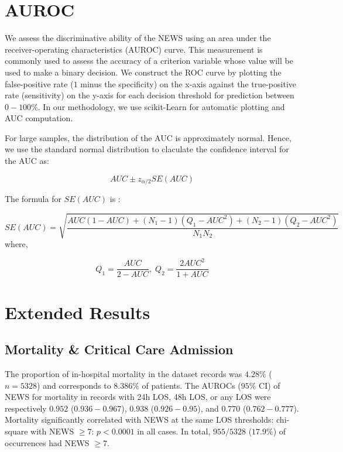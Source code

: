 \documentclass[10pt,journal, compsoc]{IEEEtran}
\begin{document}
\section{AUROC}
\label{appendix:auroc}
We assess the discriminative ability of the NEWS using an area under the receiver-operating characteristics (AUROC) curve. This measurement is commonly used to assess the accuracy of a criterion variable whose value will be used to make a binary decision. We construct the ROC curve by plotting the false-positive rate ($1$ minus the specificity) on the x-axis against the true-positive rate (sensitivity) on the y-axis for each decision threshold for prediction between $0-100\%$. In our methodology, we use scikit-Learn for automatic plotting and AUC computation.

For large samples, the distribution of the AUC is approximately normal. Hence, we use the standard normal distribution to claculate the confidence interval for the AUC as:

\begin{equation}
    AUC \pm z_{\alpha/2}SE(AUC)
\end{equation}

The formula for $SE(AUC)$ is \cite{Hanley82}:

\begin{equation}
    SE(AUC) = \sqrt{\frac{AUC(1-AUC) + (N_1-1)(Q_1-AUC^2) + (N_2-1)(Q_2-AUC^2)}{N_1N_2}}
\end{equation}
where,

\begin{equation}
    Q_1 = \frac{AUC}{2-AUC}, \;
    Q_2 = \frac{2AUC^2}{1+AUC}
\end{equation}
\newpage
\section{Extended Results}
\label{appendix:criticalevent_breakdown}
\subsection{Mortality \& Critical Care Admission}
The proportion of in-hospital mortality in the dataset records was $4.28\%$ ($n=5328$) and corresponds to $8.386\%$ of patients. The AUROCs ($95\%$ CI) of NEWS for mortality in records with 24h LOS, 48h LOS, or any LOS were respectively $0.952$ ($0.936-0.967$), $0.938$ ($0.926-0.95$), and $0.770$ ($0.762-0.777$). Mortality significantly correlated with NEWS at the same LOS thresholds: chi-square with NEWS $\geq 7$: $p < 0.0001$ in all cases. In total, $955/5328$ ($17.9\%$) of occurrences had NEWS $\geq 7$.
\end{document}
